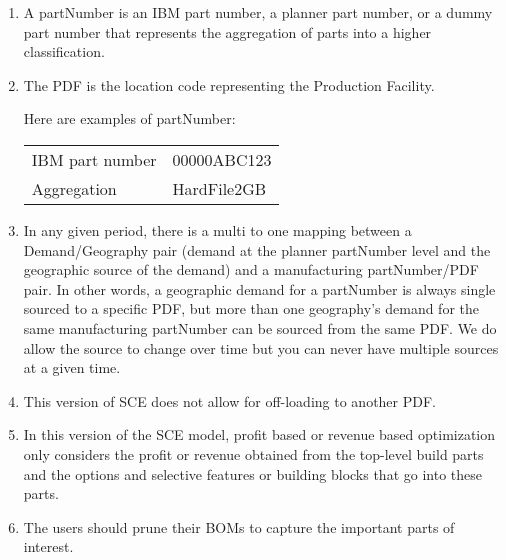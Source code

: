 \begin{enumerate}

\item A partNumber is an IBM part number, a planner part number, or a dummy part number that
represents the aggregation of parts into a higher classification.
\item The PDF is the location code representing the Production Facility.
   
Here are examples of partNumber:
\begin{center}
\begin{tabular}{ll}
  IBM part number  &   00000ABC123 \\
  Aggregation  &      HardFile2GB 
\end{tabular}
\end{center}

\item In any given period, there is a multi to one mapping between a
Demand/Geography pair (demand at the planner partNumber level and the
geographic source of the demand) and a manufacturing partNumber/PDF
pair.  In other words, a geographic demand for a partNumber is always
single sourced to a specific PDF, but more than one geography's demand
for the same manufacturing partNumber can be sourced from the same PDF.
We do allow the source to change
over time but you can never have multiple sources at a given time.

\item This version of SCE does not allow for off-loading to another PDF.
 
 
\item In this version of the SCE model, profit based or revenue based 
   optimization only considers the profit or revenue obtained from the
   top-level build parts and the options and selective features or building blocks
   that go into these parts.

\item The users should prune their BOMs to capture the important parts of
   interest.  
 
\end{enumerate}

